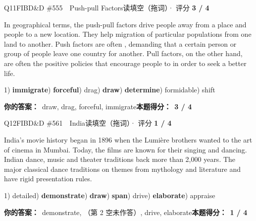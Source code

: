 \begin{qblock}{Q11\quad FIBD\&D \#555\ \ Push-pull Factors}{读填空（拖词）· 评分 \textcolor{cAccent}{\bfseries 3 / 4}}
\begin{promptbox}
In geographical terms, the push-pull factors drive people away from a place and  people to a new location. They help  migration of particular populations from one land to another. Push factors are often , demanding that a certain person or group of people leave one country for another. Pull factors, on the other hand, are often the positive policies that encourage people to  in order to seek a better life.
\end{promptbox}
{\small 1) \textbf{immigrate}) \textbf{forceful}) drag) \textbf{draw}) \textbf{determine}) formidable) shift}
\par\smallskip
\textbf{你的答案：}\ draw, {\color{cWrong}drag}, forceful, immigrate\qquad\textbf{本题得分：}\ {\color{cAccent}\bfseries 3 / 4}
\end{qblock}

\begin{qblock}{Q12\quad FIBD\&D \#561\ \ India}{读填空（拖词）· 评分 \textcolor{cAccent}{\bfseries 1 / 4}}
\begin{promptbox}
India's movie history began in 1896 when the Lumière brothers wanted to  the art of cinema in Mumbai. Today, the films are known for their  singing and dancing. Indian dance, music and theater traditions  back more than 2,000 years. The major classical dance traditions  on themes from mythology and literature and have rigid presentation rules.
\end{promptbox}
{\small 1) detailed) \textbf{demonstrate}) \textbf{draw}) \textbf{span}) drive) \textbf{elaborate}) appraise}
\par\smallskip
\textbf{你的答案：}\ demonstrate, {\color{cWrong}（第 2 空未作答）}, {\color{cWrong}drive, elaborate}\qquad\textbf{本题得分：}\ {\color{cAccent}\bfseries 1 / 4}
\end{qblock}

